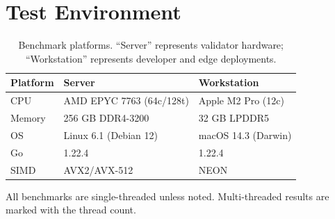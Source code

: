\section{Test Environment}


\begin{table}[h]
\centering
\begin{tabular}{@{}lll@{}}
\toprule
\textbf{Platform} & \textbf{Server} & \textbf{Workstation} \\
\midrule
CPU & AMD EPYC 7763 (64c/128t) & Apple M2 Pro (12c) \\
Memory & 256 GB DDR4-3200 & 32 GB LPDDR5 \\
OS & Linux 6.1 (Debian 12) & macOS 14.3 (Darwin) \\
Go & 1.22.4 & 1.22.4 \\
SIMD & AVX2/AVX-512 & NEON \\
\bottomrule
\end{tabular}
\caption{Benchmark platforms. ``Server'' represents validator hardware; ``Workstation'' represents developer and edge deployments.}
\label{tab:platforms}
\end{table}

All benchmarks are single-threaded unless noted. Multi-threaded results are marked with the thread count.

